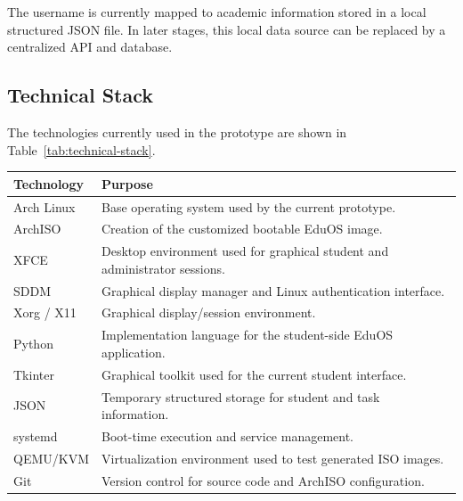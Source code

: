 \documentclass{tietreport}
\begin{document}
The username is currently mapped to academic information stored in a
local structured JSON file. In later stages, this local data source
can be replaced by a centralized API and database.

\subsection{Technical Stack}

The technologies currently used in the prototype are shown in
Table~\ref{tab:technical-stack}.

\begin{table}[H]
\centering
\renewcommand{\arraystretch}{1.25}

\begin{tabular}{|p{}|p{}|}
\hline
\textbf{Technology} & \textbf{Purpose} \\
\hline

Arch Linux &
Base operating system used by the current prototype. \\
\hline

ArchISO &
Creation of the customized bootable EduOS image. \\
\hline

XFCE &
Desktop environment used for graphical student and administrator
sessions. \\
\hline

SDDM &
Graphical display manager and Linux authentication interface. \\
\hline

Xorg / X11 &
Graphical display/session environment. \\
\hline

Python &
Implementation language for the student-side EduOS application. \\
\hline

Tkinter &
Graphical toolkit used for the current student interface. \\
\hline

JSON &
Temporary structured storage for student and task information. \\
\hline

systemd &
Boot-time execution and service management. \\
\hline

QEMU/KVM &
Virtualization environment used to test generated ISO images. \\
\hline

Git &
Version control for source code and ArchISO configuration. \\
\hline


\end{tabular}
\end{table}
\end{document}
